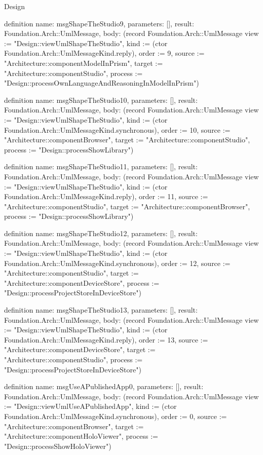 \begin{lexlean}{Design}
\begin{semanticmodule}
definition{
  name: msgShapeTheStudio9,
  parameters: [],
  result: Foundation.Arch::UmlMessage,
  body: (record Foundation.Arch::UmlMessage {view := "Design::viewUmlShapeTheStudio", kind := (ctor Foundation.Arch::UmlMessageKind.reply), order := 9, source := "Architecture::componentModelInPrism", target := "Architecture::componentStudio", process := "Design::processOwnLanguageAndReasoningInModelInPrism"})
}

definition{
  name: msgShapeTheStudio10,
  parameters: [],
  result: Foundation.Arch::UmlMessage,
  body: (record Foundation.Arch::UmlMessage {view := "Design::viewUmlShapeTheStudio", kind := (ctor Foundation.Arch::UmlMessageKind.synchronous), order := 10, source := "Architecture::componentBrowser", target := "Architecture::componentStudio", process := "Design::processShowLibrary"})
}

definition{
  name: msgShapeTheStudio11,
  parameters: [],
  result: Foundation.Arch::UmlMessage,
  body: (record Foundation.Arch::UmlMessage {view := "Design::viewUmlShapeTheStudio", kind := (ctor Foundation.Arch::UmlMessageKind.reply), order := 11, source := "Architecture::componentStudio", target := "Architecture::componentBrowser", process := "Design::processShowLibrary"})
}

definition{
  name: msgShapeTheStudio12,
  parameters: [],
  result: Foundation.Arch::UmlMessage,
  body: (record Foundation.Arch::UmlMessage {view := "Design::viewUmlShapeTheStudio", kind := (ctor Foundation.Arch::UmlMessageKind.synchronous), order := 12, source := "Architecture::componentStudio", target := "Architecture::componentDeviceStore", process := "Design::processProjectStoreInDeviceStore"})
}

definition{
  name: msgShapeTheStudio13,
  parameters: [],
  result: Foundation.Arch::UmlMessage,
  body: (record Foundation.Arch::UmlMessage {view := "Design::viewUmlShapeTheStudio", kind := (ctor Foundation.Arch::UmlMessageKind.reply), order := 13, source := "Architecture::componentDeviceStore", target := "Architecture::componentStudio", process := "Design::processProjectStoreInDeviceStore"})
}

definition{
  name: msgUseAPublishedApp0,
  parameters: [],
  result: Foundation.Arch::UmlMessage,
  body: (record Foundation.Arch::UmlMessage {view := "Design::viewUmlUseAPublishedApp", kind := (ctor Foundation.Arch::UmlMessageKind.synchronous), order := 0, source := "Architecture::componentBrowser", target := "Architecture::componentHoloViewer", process := "Design::processShowHoloViewer"})
}


\end{semanticmodule}
\end{lexlean}
